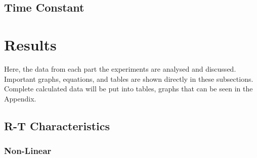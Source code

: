 \documentclass[a4,11pt]{article}
\begin{document}
\subsection{Time Constant}
\section{Results}
Here, the data from each part the experiments are analysed and discussed. Important graphs, equations, and tables are shown directly in these subsections. Complete calculated data will be put into tables, graphs that can be seen in the Appendix.
\subsection{R-T Characteristics}
\subsubsection{Non-Linear}
\end{document}
